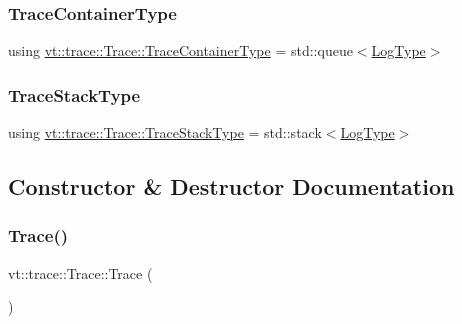 \mbox{\label{structvt_1_1trace_1_1_trace_a9d07ee9d9e92f63674da9954cfe9830b}} 
\subsubsection{\texorpdfstring{Trace\+Container\+Type}{TraceContainerType}}
{\footnotesize\ttfamily using \hyperlink{structvt_1_1trace_1_1_trace_a9d07ee9d9e92f63674da9954cfe9830b}{vt\+::trace\+::\+Trace\+::\+Trace\+Container\+Type} =  std\+::queue$<$\hyperlink{structvt_1_1trace_1_1_trace_a43306d96a91e49db081eaea016f1dd0a}{Log\+Type}$>$}

\mbox{\label{structvt_1_1trace_1_1_trace_ade12ee481e9ac72e94fe614ed03aa0dc}} 
\subsubsection{\texorpdfstring{Trace\+Stack\+Type}{TraceStackType}}
{\footnotesize\ttfamily using \hyperlink{structvt_1_1trace_1_1_trace_ade12ee481e9ac72e94fe614ed03aa0dc}{vt\+::trace\+::\+Trace\+::\+Trace\+Stack\+Type} =  std\+::stack$<$\hyperlink{structvt_1_1trace_1_1_trace_a43306d96a91e49db081eaea016f1dd0a}{Log\+Type}$>$}



\subsection{Constructor \& Destructor Documentation}
\mbox{\label{structvt_1_1trace_1_1_trace_aaa01903c742a455c14331d0f3870285b}} 
\subsubsection{\texorpdfstring{Trace()}{Trace()}\hspace{0.1cm}{\footnotesize\ttfamily [1/2]}}
{\footnotesize\ttfamily vt\+::trace\+::\+Trace\+::\+Trace (\begin{DoxyParamCaption}{ }\end{DoxyParamCaption})}

